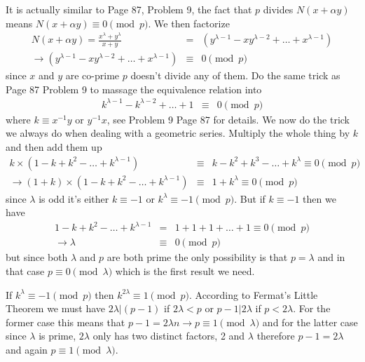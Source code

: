 \documentclass[aps,preprint,preprintnumbers,nofootinbib,showpacs,prd]{revtex4-1}
\newcommand{\nbea}{\begin{eqnarray*}}
\newcommand{\neea}{\end{eqnarray*}}
\begin{document}
It is actually similar to Page 87, Problem 9, the fact that $p$ divides $N(x + \alpha y)$ means $N(x + \alpha y) \equiv 0 \pmod{p}$. We then factorize
%
\nbea
N(x + \alpha y) = \frac{x^\lambda + y^\lambda}{x + y} & = & (y^{\lambda-1} - xy^{\lambda - 2} + \dots + x^{\lambda-1}) \\
\to (y^{\lambda-1} - xy^{\lambda - 2} + \dots + x^{\lambda-1}) & \equiv & 0 \pmod{p}
\neea
%
since $x$ and $y$ are co-prime $p$ doesn't divide any of them. Do the same trick as Page 87 Problem 9 to massage the equivalence relation into
%
\nbea
k^{\lambda-1} - k^{\lambda - 2} + \dots + 1 & \equiv & 0 \pmod{p}
\neea
%
where $k \equiv x^{-1} y$ or $y^{-1} x$, see Problem 9 Page 87 for details. We now do the trick we always do when dealing with a geometric series. Multiply the whole thing by $k$ and then add them up
%
\nbea
k \times (1 - k + k^2 - \dots + k^{\lambda - 1}) & \equiv & k - k^2 + k^3 - \dots + k^{\lambda} \equiv 0 \pmod{p} \\
\to (1 + k) \times (1 - k + k^2 - \dots + k^{\lambda - 1})  & \equiv & 1 + k^{\lambda} \equiv 0 \pmod{p}
\neea
%
since $\lambda$ is odd it's either $k \equiv -1$ or $k^{\lambda} \equiv -1 \pmod{p}$. But if $k \equiv -1$ then we have
%
\nbea
1 - k + k^2 - \dots + k^{\lambda - 1} & = & 1 + 1 + 1 + \dots + 1 \equiv 0 \pmod{p} \\
\to \lambda & \equiv & 0 \pmod{p}
\neea
%
but since both $\lambda$ and $p$ are both prime the only possibility is that $p = \lambda$ and in that case $p \equiv 0 \pmod{\lambda}$ which is the first result we need.

If $k^{\lambda} \equiv -1 \pmod{p}$ then $k^{2\lambda} \equiv 1 \pmod{p}$. According to Fermat's Little Theorem we must have $2\lambda|(p-1)$ if $2\lambda < p$ or $p-1|2\lambda$ if $p < 2\lambda$. For the former case this means that $p - 1 = 2\lambda n \to p \equiv 1 \pmod{\lambda}$ and for the latter case since $\lambda$ is prime, $2\lambda$ only has two distinct factors, 2 and $\lambda$ therefore $p - 1 = 2\lambda$ and again $p \equiv 1 \pmod{\lambda}$.
\end{document}
